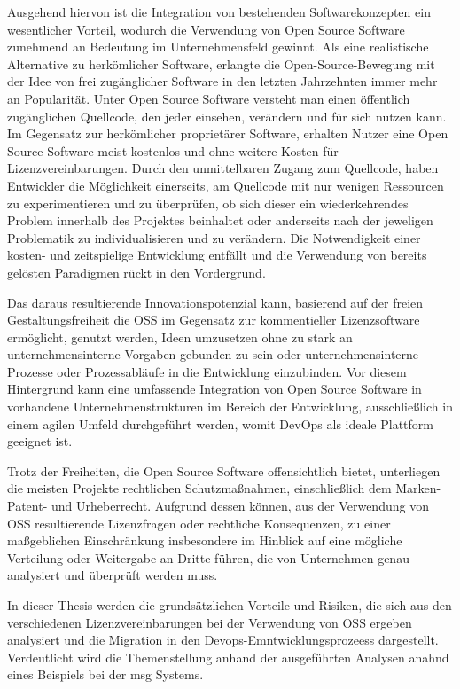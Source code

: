 Ausgehend hiervon ist die Integration von bestehenden Softwarekonzepten ein wesentlicher Vorteil, wodurch die Verwendung von Open Source Software zunehmend an Bedeutung im Unternehmensfeld gewinnt. Als eine realistische Alternative zu herkömlicher Software, erlangte die Open-Source-Bewegung mit der Idee von frei zugänglicher Software in den letzten Jahrzehnten immer mehr an Popularität. Unter Open Source Software versteht man einen öffentlich zugänglichen Quellcode, den jeder einsehen, verändern und für sich nutzen kann. Im Gegensatz zur herkömlicher proprietärer Software, erhalten Nutzer eine Open Source Software meist kostenlos und ohne weitere Kosten für Lizenzvereinbarungen. Durch den unmittelbaren Zugang zum Quellcode, haben Entwickler die Möglichkeit einerseits, am Quellcode mit nur wenigen Ressourcen zu experimentieren und zu überprüfen, ob sich dieser ein wiederkehrendes Problem innerhalb des Projektes beinhaltet oder anderseits nach der jeweligen Problematik zu individualisieren und zu verändern. Die Notwendigkeit einer kosten- und zeitspielige Entwicklung entfällt und die Verwendung von bereits gelösten Paradigmen rückt in den Vordergrund.   

Das daraus resultierende Innovationspotenzial kann, basierend auf der freien Gestaltungsfreiheit die OSS im Gegensatz zur kommentieller Lizenzsoftware ermöglicht, genutzt werden, Ideen umzusetzen ohne zu stark an unternehmensinterne Vorgaben gebunden zu sein oder unternehmensinterne Prozesse oder Prozessabläufe in die Entwicklung einzubinden. Vor diesem Hintergrund kann eine umfassende Integration von Open Source Software in vorhandene Unternehmenstrukturen im Bereich der Entwicklung, ausschließlich in einem agilen Umfeld durchgeführt werden, womit DevOps als ideale Plattform geeignet ist.  

Trotz der Freiheiten, die Open Source Software offensichtlich bietet, unterliegen die meisten Projekte rechtlichen Schutzmaßnahmen, einschließlich dem Marken- Patent- und Urheberrecht. Aufgrund dessen können, aus der Verwendung von OSS resultierende Lizenzfragen oder rechtliche Konsequenzen, zu einer maßgeblichen Einschränkung insbesondere im Hinblick auf eine mögliche Verteilung oder Weitergabe an Dritte führen, die von Unternehmen genau analysiert und überprüft werden muss.  

In dieser Thesis werden die grundsätzlichen Vorteile und Risiken, die sich aus den verschiedenen Lizenzvereinbarungen bei der Verwendung von OSS ergeben analysiert und die Migration in den Devops-Emntwicklungsprozeess dargestellt. Verdeutlicht wird die Themenstellung anhand der ausgeführten Analysen anahnd eines Beispiels bei der msg Systems. 
